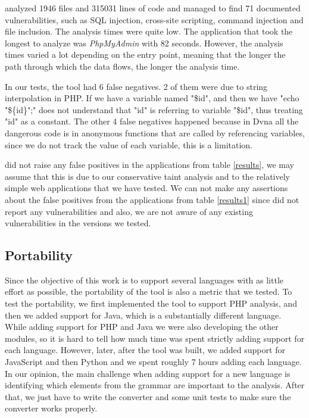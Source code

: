 \toolname{} analyzed 1946 files and 315031 lines of code and managed to find 71 documented vulnerabilities, such as SQL injection, cross-site scripting, command injection and file inclusion. The analysis times were quite low. The application that took the longest to analyze was \textit{PhpMyAdmin} with 82 seconds. However, the analysis times varied a lot depending on the entry point, meaning that the longer the path through which the data flows, the longer the analysis time.

In our tests, the tool had 6 false negatives. 2 of them were due to string interpolation in PHP. If we have a variable named "\$id", and then we have "echo "\$\{id\}";" \toolname{} does not understand that "id" is referring to variable "\$id", thus treating "id" as a constant. The other 4 false negatives happened because in Dvna all the dangerous code is in anonymous functions that are called by referencing variables, since we do not track the value of each variable, this is a limitation. 




\toolname{} did not raise any false positives in the applications from table \ref{results}, we may assume that this is due to our conservative taint analysis and to the relatively simple web applications that we have tested. We can not make any assertions about the false positives from the applications from table \ref{results1} since \toolname{} did not report any vulnerabilities and also, we are not aware of any existing vulnerabilities in the versions we tested.




\subsection{Portability}

Since the objective of this work is to support several languages with as little effort as possible, the portability of the tool is also a metric that we tested. To test the portability, we first implemented the tool to support PHP analysis, and then we added support for Java, which is a substantially different language. While adding support for PHP and Java we were also developing the other modules, so it is hard to tell how much time was spent strictly adding support for each language. However, later, after the tool was built, we added support for JavaScript and then Python and we spent roughly 7 hours adding each language. In our opinion, the main challenge when adding support for a new language is identifying which elements from the grammar are important to the analysis. After that, we just have to  write the converter and some unit tests to make sure the converter works properly.

